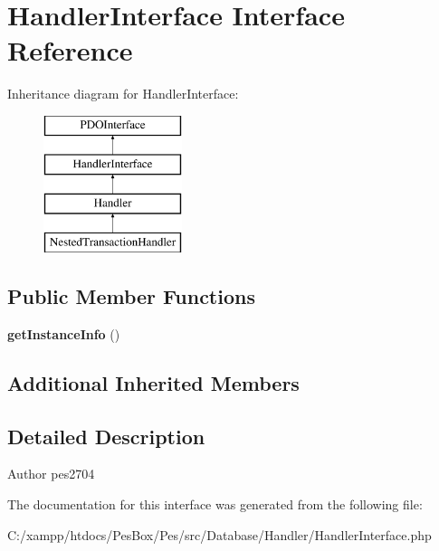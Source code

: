 \hypertarget{interface_pes_1_1_database_1_1_handler_1_1_handler_interface}{}\section{Handler\+Interface Interface Reference}
\label{interface_pes_1_1_database_1_1_handler_1_1_handler_interface}
Inheritance diagram for Handler\+Interface\+:\begin{figure}[H]
\begin{center}
\leavevmode
\includegraphics[height=4.000000cm]{interface_pes_1_1_database_1_1_handler_1_1_handler_interface}
\end{center}
\end{figure}
\subsection*{Public Member Functions}
\begin{DoxyCompactItemize}
\item 
\mbox{\label{interface_pes_1_1_database_1_1_handler_1_1_handler_interface_ad86fa5498ac1054e414a91fa4a6a7dfd}} 
{\bfseries get\+Instance\+Info} ()
\end{DoxyCompactItemize}
\subsection*{Additional Inherited Members}


\subsection{Detailed Description}
\begin{DoxyAuthor}{Author}
pes2704 
\end{DoxyAuthor}


The documentation for this interface was generated from the following file\+:\begin{DoxyCompactItemize}
\item 
C\+:/xampp/htdocs/\+Pes\+Box/\+Pes/src/\+Database/\+Handler/Handler\+Interface.\+php\end{DoxyCompactItemize}

